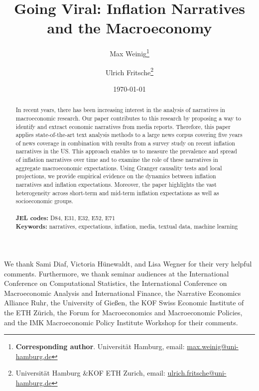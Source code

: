 \documentclass[a4paper, 12pt]{article}
\newenvironment{customabstract}
{\begin{center}\begin{minipage}{0.85\textwidth}}
		{\end{minipage}\end{center}}
\begin{document}
\title{Going Viral: Inflation Narratives and the Macroeconomy}
\author{Max Weinig\footnote{\textbf{Corresponding author}. Universität Hamburg, email:  \href{mailto:max.weinig@uni-hamburg.de}{max.weinig@uni-hamburg.de}} \and Ulrich Fritsche\footnote{Universität Hamburg \&KOF ETH Zurich, email: \href{mailto:ulrich.fritsche@uni-hamburg.de}{ulrich.fritsche@uni-hamburg.de}}}
\date{\today}

\maketitle

\begin{abstract}
    \noindent In recent years, there has been increasing interest in the analysis of narratives in macroeconomic research. Our paper contributes to this research by proposing a way to identify and extract economic narratives from media reports. Therefore, this paper applies state-of-the-art text analysis methods to a large news corpus covering five years of news coverage in combination with results from a survey study on recent inflation narratives \citep{Andre.2023} in the US. This approach enables us to measure the prevalence and spread of inflation narratives over time and to examine the role of these narratives in aggregate macroeconomic expectations. Using Granger causality tests and local projections, we provide empirical evidence on the dynamics between inflation narratives and inflation expectations. Moreover, the paper highlights the vast heterogeneity across short-term and mid-term inflation expectations as well as socioeconomic groups. \\
    \\
    \textbf{JEL codes:} D84, E31, E32, E52, E71\\
    \textbf{Keywords:} narratives, expectations, inflation, media, textual data, machine learning
\end{abstract}
\vspace{4cm}
\begin{customabstract}
 \footnotesize
	 \noindent We thank Sami Diaf, Victoria Hünewaldt, and Lisa Wegner for their very helpful comments. Furthermore, we thank seminar audiences at the International Conference on Computational Statistics, the International Conference on Macroeconomic Analysis and International Finance, the Narrative Economics Alliance Ruhr, the University of Gießen, the KOF Swiss Economic Institute of the ETH Zürich, the Forum for Macroeconomics and Macroeconomic Policies, and the IMK Macroeconomic Policy Institute Workshop for their comments. 
	
\end{customabstract}
\end{document}
